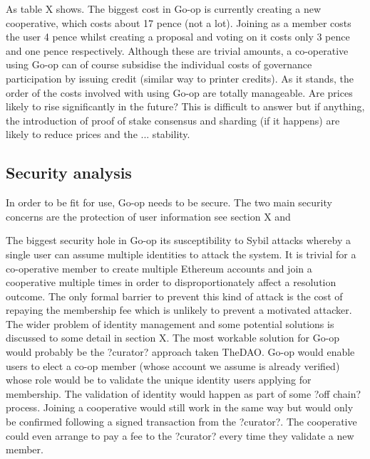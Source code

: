 As table X shows. The biggest cost in Go-op is currently creating a new cooperative, which costs about 17 pence (not a lot). Joining as a member costs the user 4 pence whilst creating a proposal and voting on it costs only 3 pence and one pence respectively. Although these are trivial amounts, a co-operative using Go-op can of course subsidise the individual costs of governance participation by issuing credit (similar way to printer credits). As it stands, the order of the costs involved with using Go-op are totally manageable. Are prices likely to rise significantly in the future? This is difficult to answer but if anything, the introduction of proof of stake consensus and sharding (if it happens) are likely to reduce prices and the  ... stability.\\

\subsection{Security analysis}
In order to be fit for use, Go-op needs to be secure. The two main security concerns are the protection of
user information see section X and 

 The biggest security hole in Go-op its susceptibility to Sybil attacks whereby a single user can assume multiple identities to attack the system. It is trivial for a co-operative member to create multiple Ethereum accounts and join a cooperative multiple times in order to disproportionately affect a resolution outcome. The only formal barrier to prevent this kind of attack is the cost of repaying the membership fee which is unlikely to prevent a motivated attacker. The wider problem of identity management and some potential solutions is discussed to some detail in section X. The most workable solution for Go-op would probably be the ?curator? approach taken TheDAO. Go-op would enable users to elect a co-op member (whose account we assume is already verified) whose role would be to validate the unique identity users applying for membership. The validation of identity would happen as part of some ?off chain? process. Joining a cooperative would still work in the same way but would only be confirmed following a signed transaction from the ?curator?. The cooperative could even arrange to pay a fee to the ?curator? every time they validate a new member.

